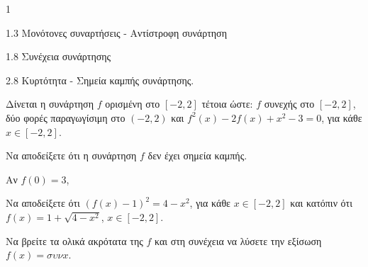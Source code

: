 \begin{ylh}{1}
    \item 1.3 Μονότονες συναρτήσεις - Αντίστροφη συνάρτηση
    \item 1.8 Συνέχεια συνάρτησης
    \item 2.8 Κυρτότητα - Σημεία καμπής συνάρτησης.
\end{ylh}
Δίνεται η συνάρτηση $f$ ορισμένη στο $[-2, 2]$ τέτοια ώστε:
$f$ συνεχής στο $[-2, 2]$, δύο φορές παραγωγίσιμη στο $(-2, 2)$ και
$f^2(x) - 2f(x) + x^2 - 3 = 0$, για κάθε $x \in [-2, 2]$.

\begin{alist}
\item Να αποδείξετε ότι η συνάρτηση $f$ δεν έχει σημεία καμπής. 
\item Αν $f(0) = 3$,
    \begin{rlist}
    \item Να αποδείξετε ότι $(f(x) - 1)^2 = 4 - x^2$, για κάθε $x \in [-2, 2]$ και κατόπιν ότι $f(x) = 1 + \sqrt{4 - x^2}$, $x \in [-2, 2]$. 
    \item Να βρείτε τα ολικά ακρότατα της $f$ και στη συνέχεια να λύσετε την εξίσωση $f(x) = \sigma\upsilon\nu x$. 
    \end{rlist}
\end{alist}